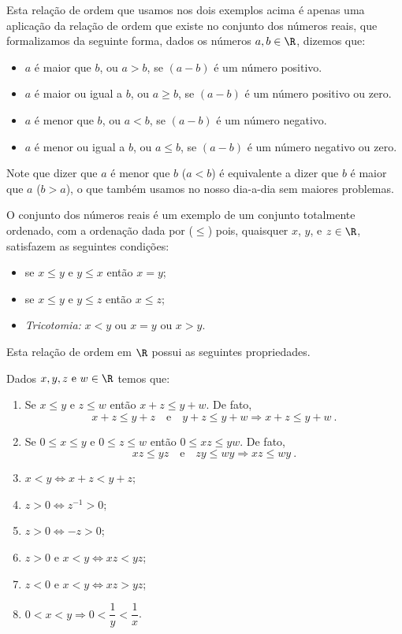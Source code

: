 Esta relação de ordem que usamos nos dois exemplos acima é apenas uma aplicação da relação de ordem que existe no conjunto dos números reais, que formalizamos da seguinte forma, dados os números $a, b \in \R$, dizemos que:

\begin{itemize}
\item $a$ é maior que $b$, ou $a > b$, se $(a - b)$ é um número positivo.
\item $a$ é maior ou igual a $b$, ou $a \geq b$, se $(a - b)$ é um número positivo ou zero.
\item $a$ é menor que $b$, ou $a < b$, se $(a - b)$ é um número negativo.
\item $a$ é menor ou igual a $b$, ou $a \leq b$, se $(a - b)$ é um número negativo ou zero.
\end{itemize}

Note que dizer que $a$ é menor que $b$ ($a < b$) é equivalente a dizer que $b$ é maior que $a$ ($b > a$), o que também usamos no nosso dia-a-dia sem maiores problemas.

O conjunto dos números reais é um exemplo de um conjunto totalmente ordenado, com a ordenação dada por ($\leq$) pois, quaisquer $x$, $y$, e $z \in \R$, satisfazem as seguintes condições:
\begin{itemize}
\item se $x \leq y$ e $y \leq x$ então $x= y$;
\item se $x \leq y$ e $y \leq z$ então $x \leq z$;
\item \textit{Tricotomia:} $x<y$ ou $x=y$ ou $x>y$.
\end{itemize}

Esta relação de ordem em $\R$ possui as seguintes propriedades.

\begin{prop} 
\label{prop.ordem} Dados $x, y, z \text{ e } w \in \R$ temos que:
\begin{enumerate}
\item Se $x \leq y$ e $z \leq w$ então $x+z \leq y+w$. De fato,
\begin{equation}
x+z \leq y+z \ \ \  \text{ e } \ \ \ y+z \leq y+w \Rightarrow x+z \leq y+w \ .
\end{equation}
\item Se $0 \leq x \leq y$ e $0 \leq z \leq w$ então $0 \leq xz \leq yw$. De fato,
\begin{equation}
xz \leq yz \ \ \  \text{ e } \ \ \  zy \leq wy \Rightarrow xz \leq wy \ .
\end{equation}
\item $x < y \Leftrightarrow x+z < y+z$;
\item $z>0 \Leftrightarrow z^{-1}>0$;
\item $z>0 \Leftrightarrow -z> 0$;
\item $z>0 \text{ e } x<y \Leftrightarrow xz<yz$;
\item $z<0 \text{ e } x<y \Leftrightarrow xz>yz$;
\item $0<x<y \Rightarrow 0< \dfrac{1}{y} < \dfrac{1}{x}$.
\end{enumerate}
\end{prop}

